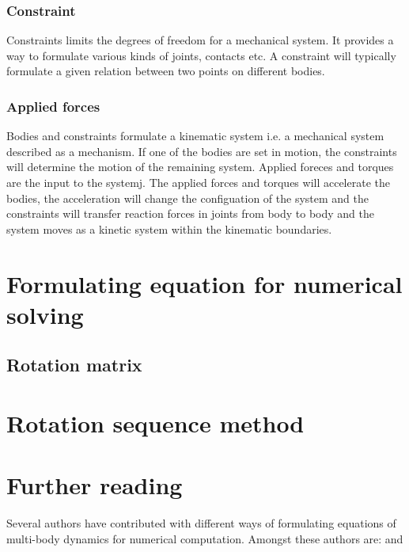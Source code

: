 \subsubsection{Constraint}
\par Constraints limits the degrees of freedom for a mechanical system. It provides a way to formulate various
	kinds of joints, contacts etc. A constraint will typically formulate a given relation between two points
	on different bodies.
	
	  	
\subsubsection{Applied forces}
\par Bodies and constraints formulate a kinematic system i.e. a mechanical system described as a mechanism. If
	one of the bodies are set in motion, the constraints will determine the motion of the remaining system. 
	Applied foreces and torques are the input to the systemj. The applied forces and torques will accelerate
	the bodies, the acceleration will change the configuation of the system and the constraints will transfer
	reaction forces in joints from body to body and the system moves as a kinetic system within the kinematic
	boundaries.
	
\section{Formulating equation for numerical solving}

\subsection{Rotation matrix}

\section{Rotation sequence method}

\section{Further reading}
\par Several authors have contributed with different ways of formulating equations of multi-body dynamics for 
	numerical computation. Amongst these authors are: \cite{nikravesh} and \cite{shabana}